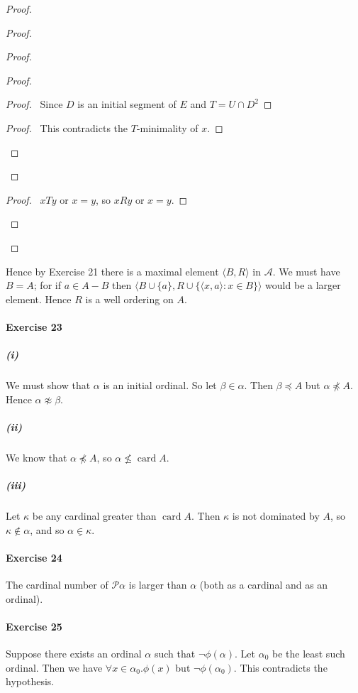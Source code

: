 \documentclass{report}
\newcommand{\card}{\ensuremath{\operatorname{card}}}
\begin{document}
\begin{proof}
\begin{proof}
\begin{proof}
\begin{proof}
                    \begin{proof}
                        \pf\ Since $D$ is an initial segment of $E$ and $T = U \cap D^2$
                    \end{proof}
                    \qedstep
                    \begin{proof}
                        \pf\ This contradicts the $T$-minimality of $x$.
                    \end{proof}
                \end{proof}
            \end{proof}
            \begin{proof}
                \pf\ $xTy$ or $x=y$, so $xRy$ or $x=y$.
            \end{proof}
        \end{proof}
    \end{proof}

    Hence by Exercise 21 there is a maximal element $\langle B, R \rangle$ in $\mathcal{A}$.
    We must have $B = A$; for if $a \in A - B$ then $\langle B \cup \{ a \}, R \cup \{ \langle x, a \rangle : x \in B \} \rangle$
    would be a larger element. Hence $R$ is a well ordering on $A$.

    \paragraph{Exercise 23}
    \subparagraph{(i)}
    We must show that $\alpha$ is an initial ordinal. So let $\beta \in \alpha$. Then $\beta \preccurlyeq A$
    but $\alpha \not\preccurlyeq A$. Hence $\alpha \not\approx \beta$.

    \subparagraph{(ii)}
    We know that $\alpha \not\preccurlyeq A$, so $\alpha \nleq \card A$.

    \subparagraph{(iii)}
    Let $\kappa$ be any cardinal greater than $\card A$. Then $\kappa$ is not dominated by $A$,
    so $\kappa \notin \alpha$, and so $\alpha \underline{\in} \kappa$.

    \paragraph{Exercise 24}
    The cardinal number of $\mathcal{P} \alpha$ is larger than $\alpha$ (both as a cardinal and as an
    ordinal).

    \paragraph{Exercise 25}
    Suppose there exists an ordinal $\alpha$ such that $\neg \phi(\alpha)$. Let $\alpha_0$ be the least
    such ordinal. Then we have $\forall x \in \alpha_0. \phi(x)$ but $\neg \phi(\alpha_0)$. This
    contradicts the hypothesis.
\end{document}
